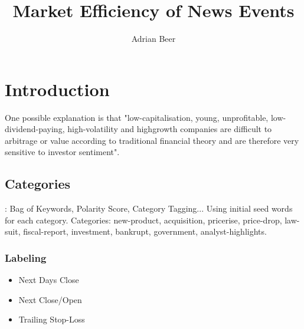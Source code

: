 \documentclass[12pt,a4paper]{article}
\title{Market Efficiency of News Events}
\author{Adrian Beer}
\date{\vspace{-10ex}}
\begin{document}
	\maketitle
	\tableofcontents 
	\section{Introduction}	
	
	One possible explanation is that "low-capitalisation, young, unprofitable, low-dividend-paying, high-volatility and highgrowth companies are difficult to arbitrage or value according to traditional financial theory and are therefore very sensitive to investor sentiment".
	
	
	\subsection{Categories}
	\cite{peng_leverage_2015}:
	Bag of Keywords, Polarity Score, Category Tagging...
	Using initial seed words for each category.
	Categories: new-product, acquisition, pricerise, price-drop, law-suit, fiscal-report, investment,
	bankrupt, government, analyst-highlights.
	
	\subsubsection{Labeling}
	\begin{itemize}
		\item{Next Days Close}
		\item{Next Close/Open}
		\item{Trailing Stop-Loss}
	\end{itemize}
	
\end{document}
